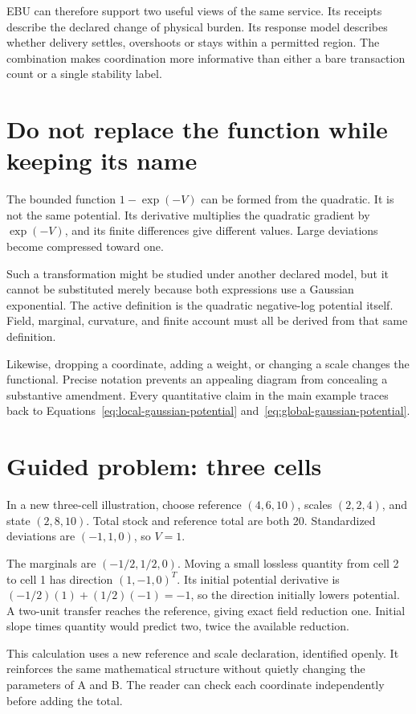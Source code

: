EBU can therefore support two useful views of the same service. Its receipts describe the declared change of physical burden. Its response model describes whether delivery settles, overshoots or stays within a permitted region. The combination makes coordination more informative than either a bare transaction count or a single stability label.

\section{Do not replace the function while keeping its name}
The bounded function \(1-\exp(-V)\) can be formed from the quadratic. It is not the same potential. Its derivative multiplies the quadratic gradient by \(\exp(-V)\), and its finite differences give different values. Large deviations become compressed toward one.

Such a transformation might be studied under another declared model, but it cannot be substituted merely because both expressions use a Gaussian exponential. The active definition is the quadratic negative-log potential itself. Field, marginal, curvature, and finite account must all be derived from that same definition.

Likewise, dropping a coordinate, adding a weight, or changing a scale changes the functional. Precise notation prevents an appealing diagram from concealing a substantive amendment. Every quantitative claim in the main example traces back to Equations~\ref{eq:local-gaussian-potential} and~\ref{eq:global-gaussian-potential}.

\section{Guided problem: three cells}
In a new three-cell illustration, choose reference \((4,6,10)\), scales \((2,2,4)\), and state \((2,8,10)\). Total stock and reference total are both 20. Standardized deviations are \((-1,1,0)\), so \(V=1\).

The marginals are \((-1/2,1/2,0)\). Moving a small lossless quantity from cell 2 to cell 1 has direction \((1,-1,0)^T\). Its initial potential derivative is \((-1/2)(1)+(1/2)(-1)=-1\), so the direction initially lowers potential. A two-unit transfer reaches the reference, giving exact field reduction one. Initial slope times quantity would predict two, twice the available reduction.

This calculation uses a new reference and scale declaration, identified openly. It reinforces the same mathematical structure without quietly changing the parameters of A and B. The reader can check each coordinate independently before adding the total.

